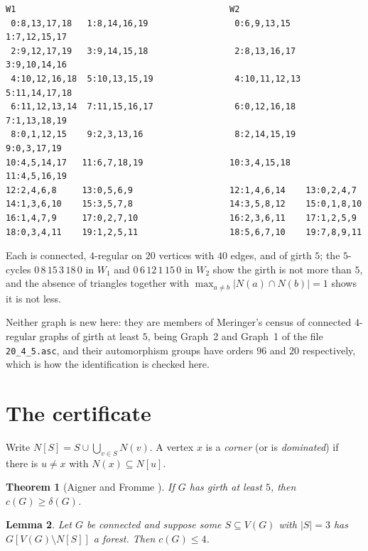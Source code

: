 \documentclass[11pt]{amsart}
\newtheorem{theorem}{Theorem}[section]
\newtheorem{lemma}[theorem]{Lemma}
\theoremstyle{remark}
\newcommand{\cn}{c}
\begin{document}
{\footnotesize
\begin{verbatim}
W1                                          W2
 0:8,13,17,18   1:8,14,16,19                 0:6,9,13,15    1:7,12,15,17
 2:9,12,17,19   3:9,14,15,18                 2:8,13,16,17   3:9,10,14,16
 4:10,12,16,18  5:10,13,15,19                4:10,11,12,13  5:11,14,17,18
 6:11,12,13,14  7:11,15,16,17                6:0,12,16,18   7:1,13,18,19
 8:0,1,12,15    9:2,3,13,16                  8:2,14,15,19   9:0,3,17,19
10:4,5,14,17   11:6,7,18,19                 10:3,4,15,18   11:4,5,16,19
12:2,4,6,8     13:0,5,6,9                   12:1,4,6,14    13:0,2,4,7
14:1,3,6,10    15:3,5,7,8                   14:3,5,8,12    15:0,1,8,10
16:1,4,7,9     17:0,2,7,10                  16:2,3,6,11    17:1,2,5,9
18:0,3,4,11    19:1,2,5,11                  18:5,6,7,10    19:7,8,9,11
\end{verbatim}
}

Each is connected, $4$-regular on $20$ vertices with $40$ edges, and of girth $5$; the
$5$-cycles $0\,8\,15\,3\,18\,0$ in $W_1$ and $0\,6\,12\,1\,15\,0$ in $W_2$ show the girth is
not more than $5$, and the absence of triangles together with
$\max_{a\ne b}|N(a)\cap N(b)|=1$ shows it is not less.

Neither graph is new here: they are members of Meringer's census \cite{Meringer} of connected
$4$-regular graphs of girth at least $5$, being Graph~2 and Graph~1 of the file
\texttt{20\_4\_5.asc}, and their automorphism groups have orders $96$ and $20$ respectively,
which is how the identification is checked here.

\section{The certificate}\label{sec:cert}

Write $N[S]=S\cup\bigcup_{v\in S}N(v)$. A vertex $x$ is a \emph{corner} (or is
\emph{dominated}) if there is $u\ne x$ with $N(x)\subseteq N[u]$.

\begin{theorem}[Aigner and Fromme \cite{AF}]\label{thm:af}
If $G$ has girth at least $5$, then $\cn(G)\ge\delta(G)$.
\end{theorem}

\begin{lemma}\label{lem:forest}
Let $G$ be connected and suppose some $S\subseteq V(G)$ with $|S|=3$ has
$G[V(G)\setminus N[S]]$ a forest. Then $\cn(G)\le4$.
\end{lemma}
\end{document}
